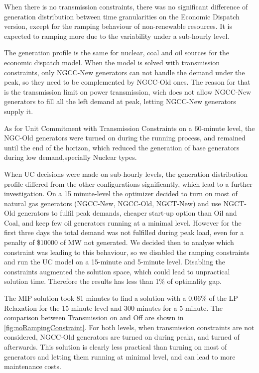 \documentclass[12pt,LUDisStyle,twosided]{book}
\begin{document}
When there is no transmission constraints, there was no significant difference of generation distribution between time granularities on the Economic Dispatch version, except for the ramping behaviour of non-renewable resources. It is expected to ramping more due to the variability under a sub-hourly level. 

The generation profile is the same for nuclear, coal and oil sources for the economic dispatch model. When the model is solved with transmission constraints, only NGCC-New generators can not handle the demand under the peak, so they need to be complemented by NGCC-Old ones. The reason for that is the transmission limit on power transmission, wich does not allow NGCC-New generators to fill all the left demand at peak, letting NGCC-New generators supply it.

As for Unit Commitment with Transmission Constraints on a 60-minute level, the NGC-Old generators were turned on during the running process, and remained until the end of the horizon, which reduced the generation of base generators during low demand,specially Nuclear types.

When UC decisions were made on sub-hourly levels, the generation distribution profile differed from the other configurations significantly, which lead to a further investigation. On a 15 minute-level the optimizer decided to turn on most of natural gas generators (NGCC-New, NGCC-Old, NGCT-New) and use NGCT-Old generators to fulfil peak demands, cheaper start-up option than Oil and Coal, and keep few oil generators running at a minimal level. However for the first three days the total demand was not fulfilled during peak load, even for a penalty of \$10000 of MW not generated. We decided then to analyse which constraint was leading to this behaviour, so we disabled the ramping constraints and run the UC model on a 15-minute and 5-minute level. Disabling the constraints augmented the solution space, which could lead to unpractical solution time. Therefore the results has less than 1\% of optimality gap.

The MIP solution took 81 minutes to find a solution with a 0.06\% of the LP Relaxation for the 15-minute level and 300 minutes for a 5-minute. The comparison between Transmission on and Off are shown in \ref{fig:noRampingConstraint}. For both levels, when transmission constraints are not considered, NGCC-Old generators are turned on during peaks, and turned of afterwards. This solution is clearly less practical than turning on most of generators and letting them running at minimal level, and can lead to more maintenance costs.
\end{document}
